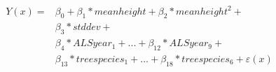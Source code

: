 \begin{equation} \label{eq:chmtspec_fullmod_term}
\begin{split}
Y(x) = &\beta_{0} + \beta_{1}*meanheight + \beta_{2}*meanheight^{2} + \\ 
&\beta_{3}*stddev + \\
&\beta_{4}*ALSyear_1 + ... + \beta_{12}*ALSyear_9 + \\
&\beta_{13}*treespecies_1 + ... + \beta_{18}*treespecies_6 + \varepsilon(x)
\end{split}
\end{equation}

